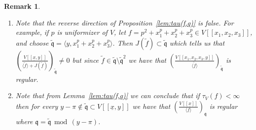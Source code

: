 \documentclass{article}
\newtheorem{proposition}[theorem]{Proposition}
\newtheorem{remark}[theorem]{Remark}
\newcommand{\maxV}{\mathfrak{m}_V}
\newcommand{\Vx}{V[[\underline{x}]]}
\newcommand{\Vxy}{V[[\underline{x},y]]}
\numberwithin{theorem}{section}
\renewcommand{\mod}{\,\operatorname{mod}\,}
\begin{document}








\begin{remark}
\begin{enumerate}
    \item \textup{Note that the reverse direction of Proposition~\ref{lem:tau(f,q)} is false. For example, if $p$ is uniformizer of $V$, let $f=p^2+x_1^p+x_2^p+x_3^p \in V[[x_1, x_2, x_3]]$, and choose $\tilde{\mathfrak{q}}=\langle y , x_1^p+x_2^p+x_3^p \rangle$. Then $J(\tilde{f}) \subset \tilde{\mathfrak{q}}$ which tells us that $\left(\frac{\Vxy}{\langle \tilde{f} \rangle + J(\tilde{f})}\right)_{\tilde{\mathfrak{q}}} \neq 0$ but since $\tilde{f} \in \tilde{\mathfrak{q}} \setminus \tilde{\mathfrak{q}}^2$ we have that $\left(\frac{V[[x_1, x_2,x_3,y]]}{\langle \tilde{f} \rangle}\right)_{\tilde{\mathfrak{q}}}$ is regular. } 
    \item \textup{Note that from Lemma~\ref{lem:tau(f,q)} we can conclude that if $\tau_V(f) < \infty$ then for every $y-\pi 
    \notin \tilde{\mathfrak{q}} \subset \Vxy$ we have that $\left(\frac{\Vx}{\langle f \rangle}\right)_{\mathfrak{q}}$ is regular where $\mathfrak{q} = \tilde{\mathfrak{q}} \mod (y-\pi)$.}
\end{enumerate}
\end{remark}
\end{document}
